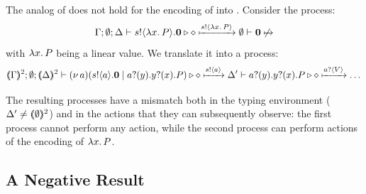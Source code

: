 \documentclass[runningheads]{llncs}
\begin{document}
{{\begin{proposition}
\begin{enumerate}[1.]
	\end{enumerate}
\end{proposition}

The analog of  does not hold for the encoding of \HOp into \sessp.
Consider the \HOp process:
\[
	\Gamma; \emptyset; \Delta \vdash s ! \langle \lambda x.\,P \rangle . \mathbf{0} \triangleright \diamond \xmapsto{s !\langle \lambda x.\,P \rangle} \emptyset \vdash \mathbf{0} \not \xmapsto{}
\]
with $\lambda x.\,P$ being a linear value.
We translate it into a \sessp process:
\[\tmap{\Gamma}{2}; \es; \tmap{\Delta}{2} \proves \newsp{a}{\bout{s}{a} \inact \Par \binp{a}{y} \binp{y}{x} P} \hastype \Proc
	 \hby{\bactout{s}{a}} \Delta' \proves \binp{a}{y} \binp{y}{x} P \hastype \Proc
\hby{\bactinp{a}{V}} \dots
\]


The resulting processes have a mismatch both in the typing
environment ($\Delta' \not= (\!\!\langle\emptyset\rangle\!\!)^{2}$)
and in the actions that they can %
subsequently observe: the first process
cannot perform any action, while the second process
can perform actions of the encoding of $\lambda x.\,P$.



\subsection{A Negative Result}
\label{ss:negative}
%

}}
\end{document}
